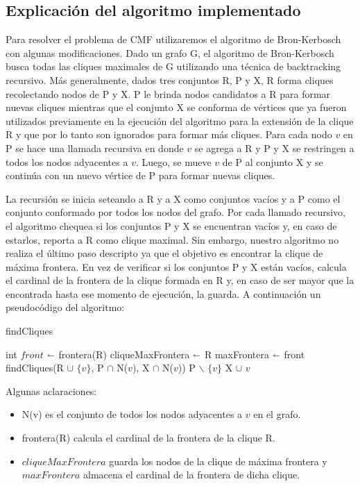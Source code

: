 \subsection{Explicación del algoritmo implementado}

Para resolver el problema de CMF utilizaremos el algoritmo de Bron-Kerbosch con algunas modificaciones. Dado un grafo G, el algoritmo de Bron-Kerbosch busca todas las cliques maximales de G utilizando una técnica de backtracking recursivo. Más generalmente, dados tres conjuntos R, P y X, R forma cliques recolectando nodos de P y X. P le brinda nodos candidatos a R para formar nuevas cliques mientras que el conjunto X se conforma de vértices que ya fueron utilizados previamente en la ejecución del algoritmo para la extensión de la clique R y que por lo tanto son ignorados para formar más cliques. Para cada nodo $v$ en P se hace una llamada recursiva en donde $v$ se agrega a R y P y X se restringen a todos los nodos adyacentes a $v$. Luego, se mueve $v$ de P al conjunto X y se continúa con un nuevo vértice de P para formar nuevas cliques.

La recursión se inicia seteando a R y a X como conjuntos vacíos y a P como el conjunto conformado por todos los nodos del grafo. Por cada llamado recursivo, el algoritmo chequea si los conjuntos P y X se encuentran vacíos y, en caso de estarlos, reporta a R como clique maximal. Sin embargo, nuestro algoritmo no realiza el último paso descripto ya que el objetivo es encontrar la clique de máxima frontera. En vez de verificar si los conjuntos P y X están vacíos, calcula el cardinal de la frontera de la clique formada en R y, en caso de ser mayor que la encontrada hasta ese momento de ejecución, la guarda. A continuación un pseudocódigo del algoritmo:

\begin{algorithm}[H]
\caption{findCliques}\label{ej1}
\begin{algorithmic}[1]
	\State int $front$ $\shortleftarrow$ frontera(R)
		\State cliqueMaxFrontera $\shortleftarrow$ R
		\State maxFrontera $\shortleftarrow$ front
	\EndIf
		\State findCliques(R $\cup$ $\{v\}$, P $\cap$ N($v$), X $\cap$ N($v$))
	\EndFor
	\State P $\backslash$ $\{v\}$
	\State X $\cup$ $v$
\EndProcedure
\end{algorithmic}
\end{algorithm}

Algunas aclaraciones:
\begin{itemize}
	\item N(v) es el conjunto de todos los nodos adyacentes a $v$ en el grafo.
	\item frontera(R) calcula el cardinal de la frontera de la clique R.
	\item $cliqueMaxFrontera$ guarda los nodos de la clique de máxima frontera y $maxFrontera$ almacena el cardinal de la frontera de dicha clique.
\end{itemize}

